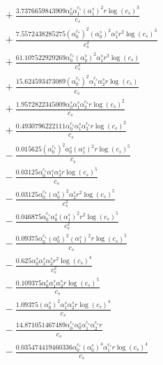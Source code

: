 \documentclass[10pt]{article}
\begin{document}
\begin{align*}
&{}  + \frac{3.7376659843909 \alpha_{0}^s \alpha_{1}^{c_s} \left(\alpha_{1}^s\right)^{2} r \log{\left(c_{s} \right)}^{3}}{c_{s}} \\
&{}  + \frac{7.5572438285275 \left(\alpha_{0}^{c_s}\right)^{2} \left(\alpha_{0}^s\right)^{2} \alpha_{1}^s r^{2} \log{\left(c_{s} \right)}^{3}}{c_{s}^{2}} \\
&{}  + \frac{61.107522929269 \alpha_{0}^{c_s} \left(\alpha_{0}^s\right)^{2} \alpha_{1}^s r^{3} \log{\left(c_{s} \right)}}{c_{s}^{3}} \\
&{}  + \frac{15.624593473089 \left(\alpha_{0}^{c_s}\right)^{2} \alpha_{1}^{c_s} \alpha_{2}^s r \log{\left(c_{s} \right)}}{c_{s}} \\
&{}  + \frac{1.9572822345009 \alpha_{0}^s \alpha_{1}^s \alpha_{3}^{c_s} r \log{\left(c_{s} \right)}^{2}}{c_{s}} \\
&{}  + \frac{0.4930796222111 \alpha_{0}^{c_s} \alpha_{1}^s \alpha_{3}^{c_s} r \log{\left(c_{s} \right)}^{2}}{c_{s}} \\
&{}  - \frac{0.015625 \left(\alpha_{0}^{c_s}\right)^{2} \alpha_{0}^s \left(\alpha_{1}^s\right)^{2} r \log{\left(c_{s} \right)}^{5}}{c_{s}} \\
&{}  - \frac{0.03125 \alpha_{0}^{c_s} \alpha_{1}^s \alpha_{3}^s r \log{\left(c_{s} \right)}^{5}}{c_{s}} \\
&{}  - \frac{0.03125 \alpha_{0}^{c_s} \left(\alpha_{0}^s\right)^{2} \alpha_{2}^s r^{2} \log{\left(c_{s} \right)}^{5}}{c_{s}^{2}} \\
&{}  - \frac{0.046875 \alpha_{0}^{c_s} \alpha_{0}^s \left(\alpha_{1}^s\right)^{2} r^{2} \log{\left(c_{s} \right)}^{5}}{c_{s}^{2}} \\
&{}  - \frac{0.09375 \alpha_{0}^{c_s} \left(\alpha_{0}^s\right)^{2} \left(\alpha_{1}^s\right)^{2} r \log{\left(c_{s} \right)}^{5}}{c_{s}} \\
&{}  - \frac{0.625 \alpha_{0}^s \alpha_{1}^s \alpha_{2}^s r^{2} \log{\left(c_{s} \right)}^{4}}{c_{s}^{2}} \\
&{}  - \frac{0.109375 \alpha_{0}^s \alpha_{1}^s \alpha_{3}^s r \log{\left(c_{s} \right)}^{5}}{c_{s}} \\
&{}  - \frac{1.09375 \left(\alpha_{0}^s\right)^{2} \alpha_{1}^s \alpha_{2}^s r \log{\left(c_{s} \right)}^{4}}{c_{s}} \\
&{}  - \frac{14.871051467489 \alpha_{0}^{c_s} \alpha_{0}^s \alpha_{1}^{c_s} \alpha_{2}^{c_s} r}{c_{s}} \\
&{}  - \frac{0.035474419460336 \alpha_{0}^{c_s} \left(\alpha_{0}^s\right)^{4} \alpha_{1}^{c_s} r \log{\left(c_{s} \right)}^{4}}{c_{s}} \\

\end{align*}
\end{document}
